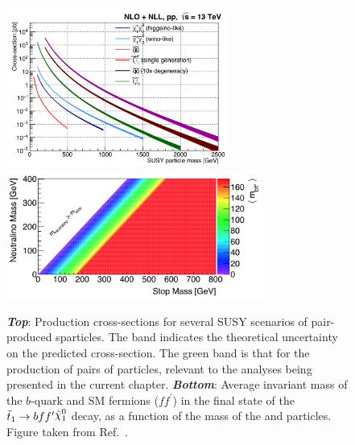 \begin{figure}[!htb]
    \begin{center}
        \includegraphics[width=0.65\textwidth]{figures/search_stop2l/SUSY_xsec_13TeV_v1}
        \includegraphics[width=0.75\textwidth]{figures/search_stop2l/nachman_stop_phase_space}
        \caption{
            \textbf{\textit{Top}}: Production cross-sections for several SUSY scenarios of pair-produced
                sparticles. The band indicates the theoretical uncertainty on the predicted cross-section.
                The green band is that for the production of pairs of \stopone particles, relevant to the
                analyses being presented in the current chapter.
            \textbf{\textit{Bottom}}: Average invariant mass of the $b$-quark and SM fermions ($f f^{\prime}$) in the
                final state of the $\stopone \rightarrow b f f^{\prime} \ninoone$ decay, as a function of the mass
                of the \stopone and \ninoone particles.
                Figure taken from Ref.~\cite{Nachman:2016qyc}.
        }
        \label{fig:stop_phase_space}
    \end{center}
\end{figure}

%
%





%
%
%
%
%
%
%
%
%
